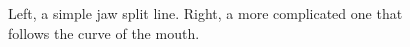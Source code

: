\documentclass[a4paper]{article}
\begin{document}
\begin{figure}[!tbp]
    \centering
    \qquad
    \caption{Left, a simple jaw split line. Right, a more complicated one that follows the curve of the mouth.}
  \label{fig:jawSplitLine}
\end{figure}

\end{document}
